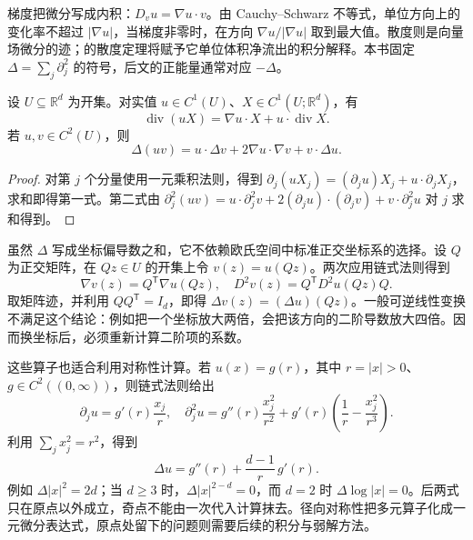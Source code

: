 梯度把微分写成内积：\(D_vu=\nabla u\cdot v\)。由 Cauchy--Schwarz 不等式，单位方向上的变化率不超过 \(\lvert\nabla u\rvert\)，当梯度非零时，在方向 \(\nabla u/\lvert\nabla u\rvert\) 取到最大值。散度则是向量场微分的迹；的散度定理将赋予它单位体积净流出的积分解释。本书固定 \(\Delta=\sum_j\partial_j^2\) 的符号，后文的正能量通常对应 \(-\Delta\)。

\begin{proposition}\label{b2:prop:01-product-rules}
设 \(U\subseteq\mathbb R^d\) 为开集。对实值 \(u\in C^1(U)\)、\(X\in C^1(U;\mathbb R^d)\)，有
\[
 \operatorname{div}(uX)=\nabla u\cdot X+u\cdot\operatorname{div}X.
\]
若 \(u,v\in C^2(U)\)，则
\[
 \Delta(uv)=u\cdot\Delta v+2\nabla u\cdot\nabla v+v\cdot\Delta u.
\]
\end{proposition}
\begin{proof}
对第 \(j\) 个分量使用一元乘积法则，得到
\(\partial_j(uX_j)=(\partial_ju)X_j+u\cdot\partial_jX_j\)，求和即得第一式。第二式由
\(\partial_j^2(uv)=u\cdot\partial_j^2v+2(\partial_ju)\cdot(\partial_jv)+v\cdot\partial_j^2u\)
对 \(j\) 求和得到。
\end{proof}

虽然 \(\Delta\) 写成坐标偏导数之和，它不依赖欧氏空间中标准正交坐标系的选择。设 \(Q\) 为正交矩阵，在 \(Qz\in U\) 的开集上令 \(v(z)=u(Qz)\)。两次应用链式法则得到
\[
 \nabla v(z)=Q^{\mathsf T}\nabla u(Qz),\quad
 D^2v(z)=Q^{\mathsf T}D^2u(Qz)Q.
\]
取矩阵迹，并利用 \(QQ^{\mathsf T}=I_d\)，即得 \(\Delta v(z)=(\Delta u)(Qz)\)。一般可逆线性变换不满足这个结论：例如把一个坐标放大两倍，会把该方向的二阶导数放大四倍。因而换坐标后，必须重新计算二阶项的系数。

\ProseParagraphBreak

这些算子也适合利用对称性计算。若 \(u(x)=g(r)\)，其中 \(r=\lvert x\rvert>0\)、\(g\in C^2((0,\infty))\)，则链式法则给出
\[
 \partial_ju=g'(r)\frac{x_j}{r},\quad
 \partial_j^2u=g''(r)\frac{x_j^2}{r^2}
 +g'(r)\left(\frac1r-\frac{x_j^2}{r^3}\right).
\]
利用 \(\sum_jx_j^2=r^2\)，得到
\begin{equation}\label{b2:eq:01-radial-laplacian}
 \Delta u=g''(r)+\frac{d-1}{r}\,g'(r).
\end{equation}
例如 \(\Delta\lvert x\rvert^2=2d\)；当 \(d\geq3\) 时，\(\Delta\lvert x\rvert^{2-d}=0\)，而 \(d=2\) 时 \(\Delta\log\lvert x\rvert=0\)。后两式只在原点以外成立，奇点不能由一次代入计算抹去。径向对称性把多元算子化成一元微分表达式，原点处留下的问题则需要后续的积分与弱解方法。
